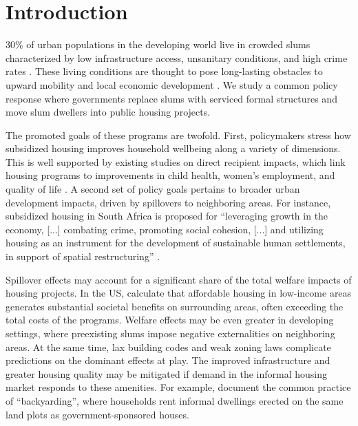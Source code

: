 \documentclass[12pt]{article}
\begin{document}
\section{Introduction} \label{sec:introduction}


30\% of urban populations in the developing world live in crowded slums characterized by low infrastructure access, unsanitary conditions, and high crime rates \citep{mdg}. These living conditions are thought to pose long-lasting obstacles to upward mobility and local economic development \citep{marx2013slums}. We study a common policy response where governments replace slums with serviced formal structures and move slum dwellers into public housing projects. 

The promoted goals of these programs are twofold. First, policymakers stress how subsidized housing improves household wellbeing along a variety of dimensions. This is well supported by existing studies on direct recipient impacts, which link housing programs to improvements in child health, women's employment, and quality of life \citep{cattaneo2009housing,franklin2016enabled,galiani2017shelter}. A second set of policy goals pertains to broader urban development impacts, driven by spillovers to neighboring areas. For instance, subsidized housing in South Africa is proposed for ``leveraging growth in the economy, [...] combating crime, promoting social cohesion, [...] and utilizing housing as an instrument for the development of sustainable human settlements, in support of spatial restructuring'' \citep{bng}. 

Spillover effects may account for a significant share of the total welfare impacts of housing projects.  In the US, \cite{diamond2016wants} calculate that affordable housing in low-income areas generates substantial societal benefits on surrounding areas, often exceeding the total costs of the programs. Welfare effects may be even greater in developing settings, where preexisting slums impose negative externalities on neighboring areas. At the same time, lax building codes and weak zoning laws complicate predictions on the dominant effects at play. The improved infrastructure and greater housing quality may be mitigated if demand in the informal housing market responds to these amenities. For example, \cite{Brueckner2018backyarding} document the common practice of ``backyarding'', where households rent informal dwellings erected on the same land plots as government-sponsored houses. 
\end{document}
